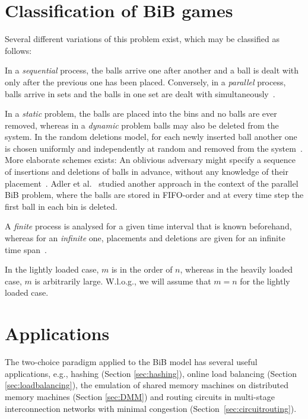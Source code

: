 \documentclass[a4paper,12pt]{article}
\begin{document}
\section{Classification of BiB games}
\label{sec:classification}
Several different variations of this problem exist, which may be classified as follows:
\begin{compactitem}
\item In a \emph{sequential} process, the balls arrive one after another and a ball is dealt with only after the previous one has been placed. Conversely, in a \emph{parallel} process, balls arrive in sets and the balls in one set are dealt with simultaneously~\cite{ABS98}. 
\item In a \emph{static} problem, the balls are placed into the bins and no balls are ever removed, whereas in a \emph{dynamic} problem balls may also be deleted from the system. In the random deletions model, for each newly inserted ball another one is chosen uniformly and independently at random and removed from the system~\cite{ABKU99, MRS01}. More elaborate schemes exists: An oblivious adversary might specify a sequence of insertions and deletions of balls in advance, without any knowledge of their placement~\cite{CFM+98}. Adler et al.~\cite{ABS98} studied another approach in the context of the parallel BiB problem, where the balls are stored in FIFO-order and at every time step the first ball in each bin is deleted. 
\item A \emph{finite} process is analysed for a given time interval that is known beforehand, whereas for an \emph{infinite} one, placements and deletions are given for an infinite time span~\cite{ABS98}.
\item In the lightly loaded case, $m$ is in the order of $n$, whereas in the heavily loaded case, $m$ is arbitrarily large. W.l.o.g., we will assume that $m = n$ for the lightly loaded case. 
\end{compactitem}

\section{Applications}
\label{sec:applications}
The two-choice paradigm applied to the BiB model has several useful applications, e.g., hashing (Section \ref{sec:hashing}), online load balancing (Section \ref{sec:loadbalancing}), the emulation of shared memory machines on distributed memory machines (Section \ref{sec:DMM}) and routing circuits in multi-stage interconnection networks with minimal congestion (Section~\ref{sec:circuitrouting}).
\end{document}
